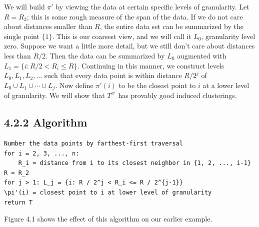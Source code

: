 \documentclass{article}
\begin{document}
We will build $\pi'$ by viewing the data at certain specific levels of granularity. Let $R = R_{2}$; this is some rough measure of the span of the data. If we do not care about distances smaller than $R$, the entire data set can be summarized by the single point $\{1\}$. This is our coarsest view, and we will call it $L_{0}$, granularity level zero. Suppose we want a little more detail, but we still don't care about distances less than $R / 2$. Then the data can be summarized by $L_{0}$ augmented with $L_{1} = \{i: R / 2 < R_{i} \leq R\}$. Continuing in this manner, we construct levels $L_{0}, L_{1}, L_{2}, \ldots$ such that every data point is within distance $R / 2^{j}$ of $L_{0} \cup L_{1} \cup \cdots \cup L_{j}$. Now define $\pi'(i)$ to be the closest point to $i$ at a lower level of granularity. We will show that $T^{\pi'}$ has provably good induced clusterings.

\subsection*{4.2.2 Algorithm}

\begin{verbatim}
Number the data points by farthest-first traversal
for i = 2, 3, ..., n:
    R_i = distance from i to its closest neighbor in {1, 2, ..., i-1}
R = R_2
for j > 1: L_j = {i: R / 2^j < R_i <= R / 2^{j-1}}
\pi'(i) = closest point to i at lower level of granularity
return T
\end{verbatim}

Figure 4.1 shows the effect of this algorithm on our earlier example.

\end{document}
